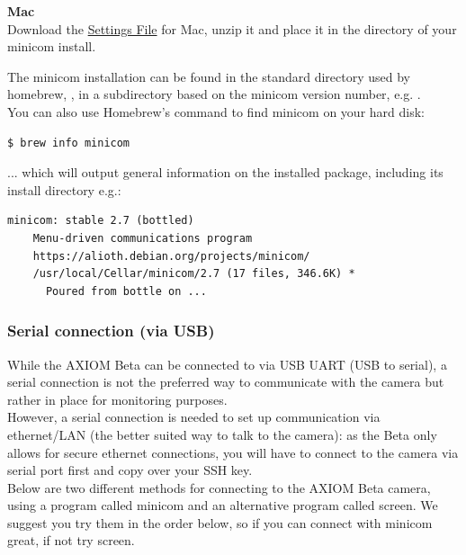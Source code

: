 \textbf{Mac}\\

Download the \href{https://wiki.apertus.org/images/0/06/Minirc.USB0_Mac.zip}{Settings File} for Mac, unzip it and place it in the  directory of your minicom install.

The minicom installation can be found in the standard directory used by homebrew, , in a subdirectory based on the minicom version number, e.g. .\\

You can also use Homebrew's  command to find minicom on your hard disk: 

\begin{lstlisting}[language=bash,morekeywords=$,keywordstyle=\bfseries,frame=none,xleftmargin=.25in,belowskip=2em, aboveskip=2em]
$ brew info minicom
\end{lstlisting}

... which will output general information on the installed package, including its install directory e.g.: 

\begin{lstlisting}[breaklines=true, breakatwhitespace=true]
    minicom: stable 2.7 (bottled)
    Menu-driven communications program
    https://alioth.debian.org/projects/minicom/
    /usr/local/Cellar/minicom/2.7 (17 files, 346.6K) *
      Poured from bottle on ...
\end{lstlisting}

\subsubsection{Serial connection (via USB)}

While the AXIOM Beta can be connected to via USB UART (USB to serial), a serial connection is not the preferred way to communicate with the camera but rather in place for monitoring purposes.\\

However, a serial connection is needed to set up communication via ethernet/LAN (the better suited way to talk to the camera): as the Beta only allows for secure ethernet connections, you will have to connect to the camera via serial port first and copy over your SSH key.\\

Below are two different methods for connecting to the AXIOM Beta camera, using a program called minicom and an alternative program called screen. We suggest you try them in the order below, so if you can connect with minicom great, if not try screen. \\


